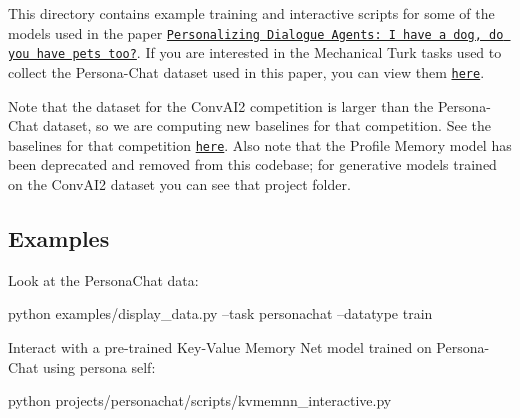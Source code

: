 This directory contains example training and interactive scripts for some of the models used in the paper \href{https://arxiv.org/pdf/1801.07243.pdf}{\tt Personalizing Dialogue Agents\+: I have a dog, do you have pets too?}. If you are interested in the Mechanical Turk tasks used to collect the Persona-\/\+Chat dataset used in this paper, you can view them \href{https://github.com/facebookresearch/ParlAI/tree/master/parlai/mturk/tasks/personachat}{\tt here}.

Note that the dataset for the Conv\+A\+I2 competition is larger than the Persona-\/\+Chat dataset, so we are computing new baselines for that competition. See the baselines for that competition \href{https://github.com/facebookresearch/ParlAI/tree/master/projects/convai2}{\tt here}. Also note that the Profile Memory model has been deprecated and removed from this codebase; for generative models trained on the Conv\+A\+I2 dataset you can see that project folder.

\subsection*{Examples}

Look at the Persona\+Chat data\+: 
\begin{DoxyCode}
python examples/display\_data.py --task personachat --datatype train
\end{DoxyCode}


Interact with a pre-\/trained Key-\/\+Value Memory Net model trained on Persona-\/\+Chat using persona \textquotesingle{}self\textquotesingle{}\+: 
\begin{DoxyCode}
python projects/personachat/scripts/kvmemnn\_interactive.py
\end{DoxyCode}
 